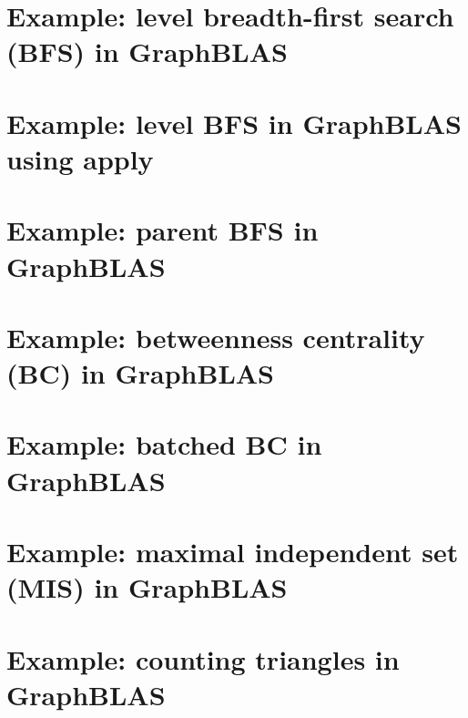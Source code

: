 \pagebreak
\nolinenumbers
\section{Example: level breadth-first search (BFS) in GraphBLAS}
{\scriptsize

}
\vfill

\pagebreak
\nolinenumbers
\section{Example: level BFS in GraphBLAS using apply}
{\scriptsize

}
\vfill

\pagebreak
\nolinenumbers
\section{Example: parent BFS in GraphBLAS}
{\scriptsize

}
\vfill

\pagebreak
\nolinenumbers
\section{Example: betweenness centrality (BC) in GraphBLAS}
\label{App:BCnobatch}
{\scriptsize

}
\vfill

\pagebreak
\nolinenumbers
\section{Example: batched BC in GraphBLAS}
{\scriptsize

}
\vfill

\pagebreak
\nolinenumbers
\section{Example: maximal independent set (MIS) in GraphBLAS}
{\scriptsize

}
\vfill

\pagebreak
\nolinenumbers
\section{Example: counting triangles in GraphBLAS}
{\scriptsize

}
\vfill
\pagebreak

\linenumbers
